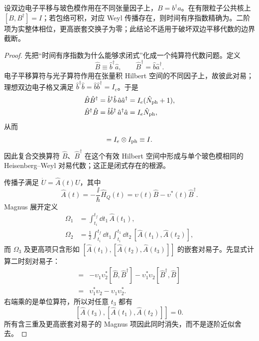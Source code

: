 \begin{theorem}
设双边电子平移与玻色模作用在不同张量因子上，$B=b^\dagger a$。在有限粒子公共核上 $[B,B^\dagger]=I$；若包络可积，对应 Weyl 传播存在，则时间有序指数精确为。二阶项为实整体相位，更高嵌套交换子为零；此结论不适用于破坏双边平移代数的边界截断。
\end{theorem}
\begin{proof}
先把“时间有序指数为什么能够求闭式”化成一个纯算符代数问题。定义
\[
\hat B\equiv\hat b^\dagger\hat a,
\qquad
\hat B^\dagger=\hat b\hat a^\dagger.
\]
电子平移算符与光子算符作用在张量积 Hilbert 空间的不同因子上，故彼此对易；理想双边电子格又满足 $\hat b^\dagger\hat b=\hat b\hat b^\dagger=I_e$。于是
\begin{align*}
\hat B\hat B^\dagger
&=\hat b^\dagger\hat b\,\hat a\hat a^\dagger
=I_e(\hat N_{\rm ph}+1),\\
\hat B^\dagger\hat B
&=\hat b\hat b^\dagger\,\hat a^\dagger\hat a
=I_e\hat N_{\rm ph},
\end{align*}
从而
\begin{equation*}
[\hat B,\hat B^\dagger]=I_e\otimes I_{\rm ph}\equiv I.
\end{equation*}
因此复合交换算符 $\hat B$、$\hat B^\dagger$ 在这个有效 Hilbert 空间中形成与单个玻色模相同的 Heisenberg--Weyl 对易代数；这正是闭式存在的根源。

传播子满足 $\dot U=\hat A(t)U$，其中
\begin{equation*}
\hat A(t)=-\frac{\ii}{\hbar}\hat H_Q(t)
=\upsilon(t)\hat B-\upsilon^*(t)\hat B^\dagger.
\end{equation*}
Magnus 展开定义
\begin{align*}
\Omega_1&=\int_{t_i}^{t_f}\dd t_1\,\hat A(t_1),\\
\Omega_2&=\frac12\int_{t_i}^{t_f}\dd t_1
\int_{t_i}^{t_1}\dd t_2\,[\hat A(t_1),\hat A(t_2)],
\end{align*}
而 $\Omega_3$ 及更高项只含形如 $[\hat A(t_1),[\hat A(t_2),\hat A(t_3)]]$ 的嵌套对易子。先显式计算二时刻对易子：
\begin{align*}
[\hat A_1,\hat A_2]
={}&-\upsilon_1\upsilon_2^*[\hat B,\hat B^\dagger]
-\upsilon_1^*\upsilon_2[\hat B^\dagger,\hat B]\\
={}&\upsilon_1^*\upsilon_2-\upsilon_1\upsilon_2^*.
\end{align*}
右端乘的是单位算符，所以对任意 $t_3$ 都有
\[
[\hat A(t_3),[\hat A(t_1),\hat A(t_2)]]=0.
\]
所有含三重及更高嵌套对易子的 Magnus 项因此同时消失，而不是逐阶近似舍去。


\end{proof}
